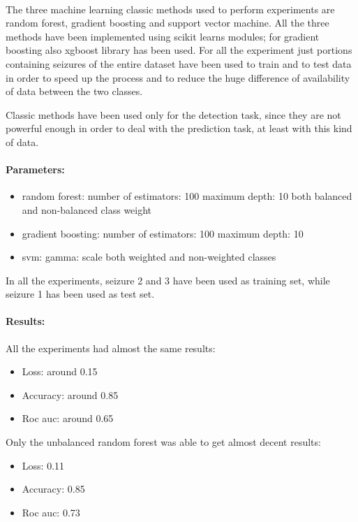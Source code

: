 \paragraph{} The three machine learning classic methods used to perform experiments are random forest, gradient boosting and support vector machine. All the three methods have been implemented using scikit learns modules; for gradient boosting also xgboost library has been used. For all the experiment just portions containing seizures of the entire dataset have been used to train and to test data in order to speed up the process and to reduce the huge difference of availability of data between the two classes.

Classic methods have been used only for the detection task, since they are not powerful enough in order to deal with the prediction task, at least with this kind of data.

\paragraph{Parameters:}
\begin{itemize}
    \item random forest:
        \subitem number of estimators: 100
        \subitem maximum depth: 10
        \subitem both balanced and non-balanced class weight
    \item gradient boosting:
        \subitem number of estimators: 100
        \subitem maximum depth: 10
    \item svm:
        \subitem gamma: scale
        \subitem both weighted and non-weighted classes
\end{itemize}

In all the experiments, seizure 2 and 3 have been used as training set, while seizure 1 has been used as test set.

\paragraph{Results:} All the experiments had almost the same results:
\begin{itemize}
    \item Loss: around 0.15
    \item Accuracy: around 0.85
    \item Roc auc: around 0.65
\end{itemize}

Only the unbalanced random forest was able to get almost decent results:
\begin{itemize}
    \item Loss: 0.11
    \item Accuracy: 0.85
    \item Roc auc: 0.73
\end{itemize}

